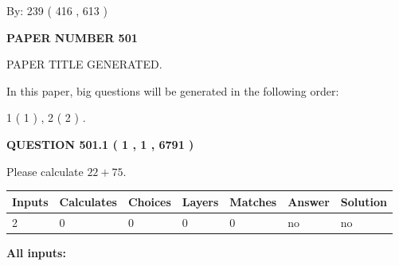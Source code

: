 \documentclass[12pt]{article}
\begin{document}
   
\hspace{1.0in} By: 
 239 ( 416 ,  613 )
   
   
   
   
\newpage 
\setcounter{page}{ 
   501001 } 
   
   
   
   
 {\textbf{ \Large{ PAPER NUMBER  501  }}}
   
   
\vspace{0.2in}
   
   
   
   
   
   
   
   
 \vspace{0.2in}
 
 
 
 
   
   
 PAPER TITLE GENERATED.
   
   
   
\vspace{0.2in}
   
In this paper, big questions will be generated in the following order: 
   
   
   1 ( 1 )
 ,
   2 ( 2 )
 .
  
\vspace{0.2in}
  
{\textbf{\Large{QUESTION
501.1 
 ( 1 , 1 , 6791 )
}}}
  
  
 
Please calculate $ %
22 +  %
75 $.
 
 
   
   
   
   
\noindent\begin{tabular}{|l|l|l|l|l|l|l|}
 \hline
Inputs & Calculates & Choices & Layers & Matches & Answer & Solution \\ \hline
 2  & 
 0  & 
 0
  & 
 0  & 
 0  & 
  no & 
  no 
  \\ \hline
 \end{tabular}
   
   
   
   
\noindent{}
   
   
   
   
\noindent\vspace{0.1in}\hspace{-0.08in} {\textbf{\Large{All inputs: }}}
   
\end{document}
